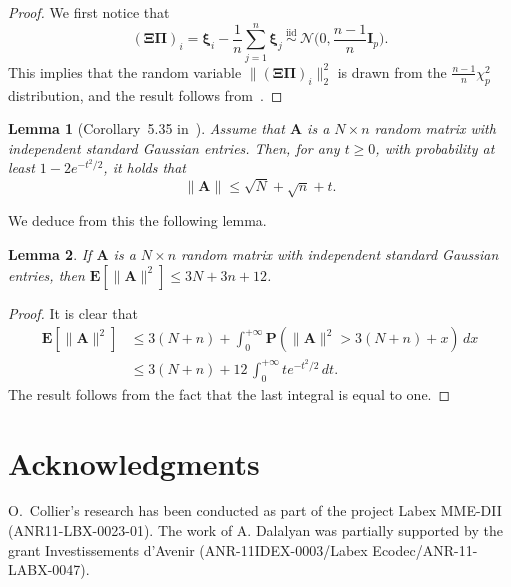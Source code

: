 \documentclass[sts,preprint,reqno,a4paper]{imsart}
\def\bxi{\boldsymbol\xi}
\def\bXi{\boldsymbol\Xi}
\def\bfA{\mathbf A}
\def\bfI{\mathbf I}
\def\bfPi{\mathbf\Pi}
\def\pinf{{+\infty}}
\def\esp{\mathbf E}
\def\prob{\mathbf P}
\def\simiid{\overset{\text{iid}}{\sim}}
\theoremstyle{plain}
\newtheorem{lemma}{Lemma}
\theoremstyle{remark}
\theoremstyle{definition}
\begin{document}
\begin{proof}
	We first notice that
	\begin{equation}
		(\bXi\bfPi)_i = \bxi_i - \frac1n\sum_{j=1}^n \bxi_j\ \simiid\ 
		\mathcal{N}\big(0,{\textstyle\frac{n-1}{n}}\bfI_p\big).
	\end{equation}
	This implies that the random variable
	$\big\|(\bXi\bfPi)_i\big\|_2^2$ is drawn from the $\frac{n-1}{n} \chi^2_p$ 
	distribution, and the result follows from~\Cref{lemme_chideux}.
\end{proof}

\begin{lemma}[Corollary~5.35 in~\citet*{vershynin_2012}]\label{lemma_Wishart1}
	Assume that $\bfA$ is a $N\times n$ random matrix with independent standard Gaussian entries.
	Then, for any $t\ge 0$,  with probability at least $1-2e^{-t^2/2}$, it holds that
	\begin{equation}
	\|\bfA\| \le \sqrt{N}+\sqrt{n}+t.
	\end{equation}
\end{lemma}

We deduce from this the following lemma.

\begin{lemma}\label{lemma_Wishart2}
	If $\bfA$ is a $N\times n$ random matrix with independent standard Gaussian
	entries, then
	$\esp[\|\bfA\|^2] \le 3N+3n+12$.	
\end{lemma}

\begin{proof}
	It is clear that
	\begin{align}
	\esp[\|\bfA\|^2] &\le 3(N+n) + \int_0^\pinf \prob(\|\bfA\|^2>3(N+n)+x)\, dx \\
	&\le 3(N+n) + 12\,\int_0^\pinf te^{-t^2/2}\, dt.
	\end{align}
	The result follows from the fact that the last integral is equal to one.
\end{proof}

\section*{Acknowledgments}
O.\ Collier's research has been conducted as part of the project Labex MME-DII (ANR11-LBX-0023-01).
The work of A. Dalalyan was partially supported by the grant Investissements d'Avenir
(ANR-11IDEX-0003/Labex Ecodec/ANR-11-LABX-0047).



\end{document}

